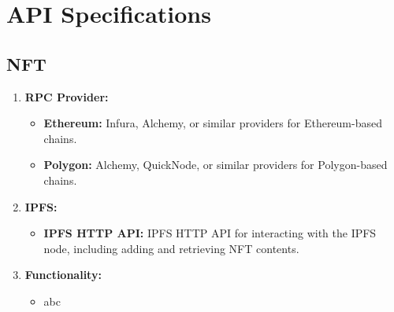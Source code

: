 \newpage

\chapter{API Specifications}
\section{NFT}
\begin{enumerate}
    \item \textbf{RPC Provider:}
    \begin{itemize}
        \item \textbf{Ethereum:} Infura, Alchemy, or similar providers for Ethereum-based chains.
        \item \textbf{Polygon:} Alchemy, QuickNode, or similar providers for Polygon-based chains.
    \end{itemize}

    \item \textbf{IPFS:}
    \begin{itemize}
        \item \textbf{IPFS HTTP API:} IPFS HTTP API for interacting with the IPFS node, including adding and retrieving NFT contents.
    \end{itemize}

    \item \textbf{Functionality:}
    \begin{itemize}
        \item abc
    \end{itemize}
\end{enumerate}
\newpage
